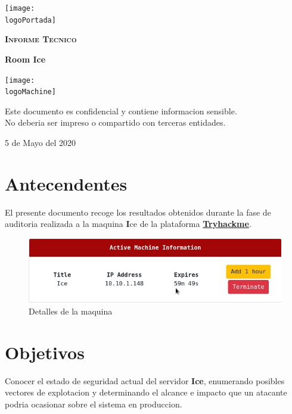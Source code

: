 \documentclass[a4paper]{article}%
\newcommand{\logoPortada}{try_hack_me.png}
\newcommand{\machineName}{Ice} %
\newcommand{\logoMachine}{ice_logo.png} %
\newcommand{\startDate}{5 de Mayo del 2020}
\begin{document}
	\cfoot{\thepage}
	\begin{titlepage}
	\centering
	\texttt{[image: \\logoPortada]}\par\vspace{1cm}
	{\scshape\LARGE \textbf{Informe Tecnico}\par }
	\vspace{0.2cm}
	{\Huge\bfseries\textcolor{greenPortada}{Room \machineName}\par}
	\vfill\vfill
	\texttt{[image: \\logoMachine]}\par\vspace{1cm}
	\vfill
	\begin{tcolorbox}[colback=red!5!white,colframe=red!75!black]
		\centering
		Este documento es confidencial y contiene informacion sensible.\\No deberia
		ser impreso o compartido con terceras entidades.
	\end{tcolorbox}	
	\vfill
	{\large \startDate\par}
	\vfill
	\end{titlepage}
	\clearpage
	\tableofcontents
	\clearpage
	\section{Antecendentes}
	El presente documento recoge los resultados obtenidos durante la fase de auditoria
	realizada a la maquina {\textbf\machineName} de la plataforma 
	\href{https://tryhackme.com}{\textbf{Tryhackme}}. 
	\vspace{0.2cm}

	\begin{figure}[h]
	\centering
	\includegraphics[width=\textwidth]{informacion_maquina.jpeg}
	\caption{Detalles de la maquina}
	\end{figure}
	
	\section{Objetivos}
	Conocer el estado de seguridad actual del servidor \textbf{\machineName}, enumerando
	posibles vectores de explotacion y determinando el alcance e impacto que un atacante
	podria ocasionar sobre el sistema en produccion.
	
\end{document}
